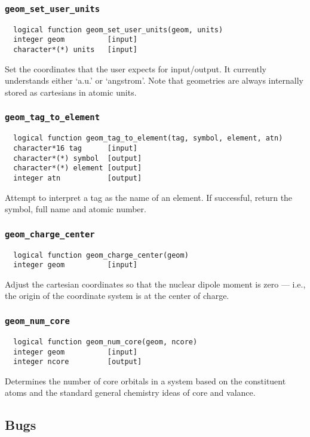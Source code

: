 \subsubsection{{\tt geom\_set\_user\_units}}
\begin{verbatim}
  logical function geom_set_user_units(geom, units)
  integer geom          [input]
  character*(*) units   [input]
\end{verbatim}
Set the coordinates that the user expects for input/output.  It
currently understands either `a.u.' or `angstrom'.  Note that
geometries are always internally stored as cartesians in atomic units.

\subsubsection{{\tt geom\_tag\_to\_element}}
\begin{verbatim}
  logical function geom_tag_to_element(tag, symbol, element, atn)
  character*16 tag      [input]
  character*(*) symbol  [output]
  character*(*) element [output]
  integer atn           [output]
\end{verbatim}
Attempt to interpret a tag as the name of an element.  If successful,
return the symbol, full name and atomic number.

\subsubsection{{\tt geom\_charge\_center}}
\begin{verbatim}
  logical function geom_charge_center(geom)
  integer geom          [input]
\end{verbatim}
Adjust the cartesian coordinates so that the nuclear dipole moment is
zero --- i.e., the origin of the coordinate system is at the center of
charge.

\subsubsection{{\tt geom\_num\_core}}
\begin{verbatim}
  logical function geom_num_core(geom, ncore)
  integer geom          [input]
  integer ncore         [output]
\end{verbatim}
Determines the number of core orbitals in a system based on the
constituent atoms and the standard general chemistry ideas of core and
valance.

\subsection{Bugs}

